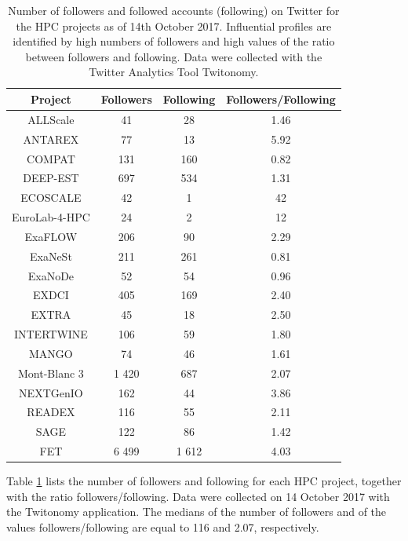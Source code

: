 \begin{table}[t]
 \begin{center}
 {\footnotesize
  \begin{tabular}{cccc}
   \hline 
   \hline
   Project & Followers & Following & Followers/Following \\ 
   \hline
   \hline
   ALLScale & 41 & 28 & 1.46 \\
   ANTAREX & 77 & 13 & 5.92 \\
   COMPAT & 131 & 160 & 0.82 \\
   DEEP-EST & 697 & 534 & 1.31 \\
   ECOSCALE & 42 & 1 & 42 \\
   EuroLab-4-HPC & 24 & 2 & 12 \\
   ExaFLOW & 206 & 90 & 2.29 \\
   ExaNeSt & 211 & 261 & 0.81  \\
   ExaNoDe & 52 & 54 & 0.96 \\
   EXDCI & 405 & 169 & 2.40 \\
   EXTRA & 45 & 18 & 2.50\\
   INTERTWINE & 106 & 59 & 1.80 \\
   MANGO & 74 & 46 & 1.61 \\
   Mont-Blanc 3 & 1 420 & 687 & 2.07 \\
   NEXTGenIO & 162 & 44 & 3.86 \\
   READEX & 116 & 55 & 2.11 \\
   SAGE & 122 & 86 & 1.42 \\ 
   FET & 6 499 & 1 612 & 4.03 \\
   \hline
   \hline
  \end{tabular}
 } 
 \end{center} 
 \caption{Number of followers and followed accounts (following) on Twitter for the HPC projects as of 14th October 2017. Influential profiles are identified by high numbers of followers and high values of the ratio between followers and following. Data were collected with the Twitter Analytics Tool Twitonomy.}
\label{HPC_influence_table} 
\end{table}

Table \ref{HPC_influence_table} lists the number of followers and following for each HPC project, together with the ratio followers/following. Data were collected on 14 October 2017 with the Twitonomy application. The medians of the number of followers and of the values followers/following are equal to 116 and 2.07, respectively. 

